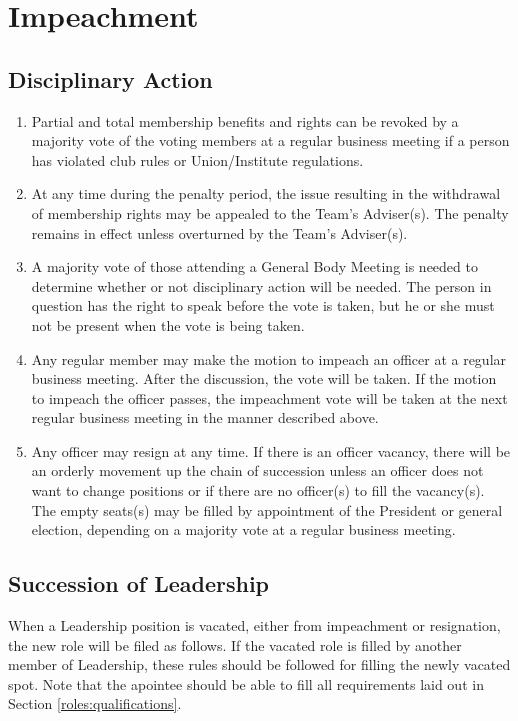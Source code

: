 \section{Impeachment}
\label{impeachment}

\subsection{Disciplinary Action}
\label{impeachment:discipline}

\begin{enumerate}
\item Partial and total membership benefits and rights can be revoked by a majority vote of the voting members at a regular business meeting if a person has violated club rules or Union/Institute regulations.
\item At any time during the penalty period, the issue resulting in the withdrawal of membership rights may be appealed to the Team’s Adviser(s). The penalty remains in effect unless overturned by the Team’s Adviser(s).
\item A majority vote of those attending a General Body Meeting is needed to determine whether or not disciplinary action will be needed. The person in question has the right to speak before the vote is taken, but he or she must not be present when the vote is being taken.
\item Any regular member may make the motion to impeach an officer at a regular business meeting. After the discussion, the vote will be taken. If the motion to impeach the officer passes, the impeachment vote will be taken at the next regular business meeting in the manner described above.
\item Any officer may resign at any time. If there is an officer vacancy, there will be an orderly movement up the chain of succession unless an officer does not want to change positions or if there are no officer(s) to fill the vacancy(s). The empty seats(s) may be filled by appointment of the President or general election, depending on a majority vote at a regular business meeting. 
\end{enumerate}

\subsection{Succession of Leadership}
\label{impeachment:succession}

When a Leadership position is vacated, either from impeachment or resignation, the new role will be filed as follows. If the vacated role is filled by another member of Leadership, these rules should be followed for filling the newly vacated spot. Note that the apointee should be able to fill all requirements laid out in Section \ref{roles:qualifications}.

